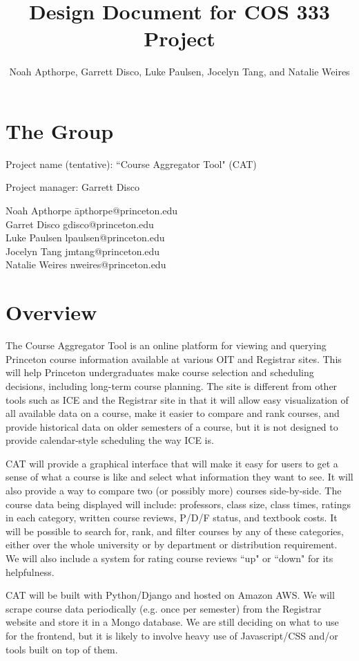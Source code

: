 \documentclass[11pt]{article}
\title{ Design Document for COS 333 Project }
\author{Noah Apthorpe, Garrett Disco, Luke Paulsen, Jocelyn Tang, and Natalie Weires}
\begin{document}
\maketitle

\section{The Group}
\par Project name (tentative): ``Course Aggregator Tool" (CAT)
\par Project manager: Garrett Disco
\begin{tabbing}
Noah Apthorpe   \= apthorpe@princeton.edu \\
Garret Disco \> gdisco@princeton.edu \\
Luke Paulsen \> lpaulsen@princeton.edu \\
Jocelyn Tang \> jmtang@princeton.edu \\
Natalie Weires \> nweires@princeton.edu \\
\end{tabbing}

\section{Overview}
\par The Course Aggregator Tool is an online platform for viewing and querying Princeton course information available at various OIT and Registrar sites. This will help Princeton undergraduates make course selection and scheduling decisions, including long-term course planning. The site is different from other tools such as ICE and the Registrar site in that it will allow easy visualization of all available data on a course, make it easier to compare and rank courses, and provide historical data on older semesters of a course, but it is not designed to provide calendar-style scheduling the way ICE is.
\par CAT will provide a graphical interface that will make it easy for users to get a sense of what a course is like and select what information they want to see. It will also provide a way to compare two (or possibly more) courses side-by-side. The course data being displayed will include: professors, class size, class times, ratings in each category, written course reviews, P/D/F status, and textbook costs. It will be possible to search for, rank, and filter courses by any of these categories, either over the whole university or by department or distribution requirement. We will also include a system for rating course reviews ``up" or ``down" for its helpfulness.
\par CAT will be built with Python/Django and hosted on Amazon AWS. We will scrape course data periodically (e.g. once per semester) from the Registrar website and store it in a Mongo database. We are still deciding on what to use for the frontend, but it is likely to involve heavy use of Javascript/CSS and/or tools built on top of them.
\end{document}
